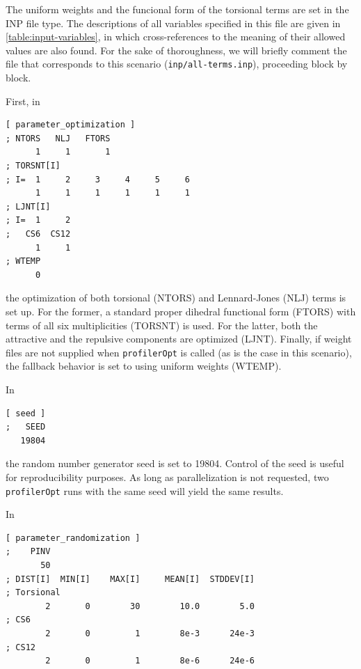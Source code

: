 \documentclass[10pt,a4paper,openany]{memoir}
\numberwithin{equation}{section}
\newcommand{\profileropt}[0]{\texttt{profilerOpt}}
\begin{document}
The uniform weights and the funcional form of the torsional terms are
set in the INP file type.
%
The descriptions of all variables specified in this file are given in
\autoref{table:input-variables}, in which cross-references to the
meaning of their allowed values are also found.
%
For the sake of thoroughness, we will briefly comment the file that
corresponds to this scenario (\texttt{inp/all-terms.inp}), proceeding
block by block.

First, in

\begin{lstlisting}[language=gromacs]
[ parameter_optimization ]
; NTORS   NLJ   FTORS
      1     1       1    
; TORSNT[I]
; I=  1     2     3     4     5     6
      1     1     1     1     1     1
; LJNT[I]
; I=  1     2
;   CS6  CS12
      1     1
; WTEMP
      0
\end{lstlisting}\vspace{1ex}\par

\noindent the optimization of both torsional (NTORS) and
Lennard-Jones (NLJ) terms is set up.
%
For the former, a standard proper dihedral functional form (FTORS)
with terms of all six multiplicities (TORSNT) is used.
%
For the latter, both the attractive and the repulsive components are
optimized (LJNT).
%
Finally, if weight files are not supplied when \profileropt{} is
called (as is the case in this scenario), the fallback behavior is set
to using uniform weights (WTEMP).

In

\begin{lstlisting}[language=gromacs]
[ seed ]
;   SEED
   19804
\end{lstlisting}\vspace{1ex}\par

\noindent the random number generator seed is set to 19804.
%
Control of the seed is useful for reproducibility purposes.
%
As long as parallelization is not requested, two \profileropt{} runs
with the same seed will yield the same results.

In

\begin{lstlisting}[language=gromacs]
[ parameter_randomization ]
;    PINV
       50
; DIST[I]  MIN[I]    MAX[I]     MEAN[I]  STDDEV[I]
; Torsional
        2       0        30        10.0        5.0 
; CS6
        2       0         1        8e-3      24e-3
; CS12
        2       0         1        8e-6      24e-6
\end{lstlisting}\vspace{1ex}\par
\end{document}
